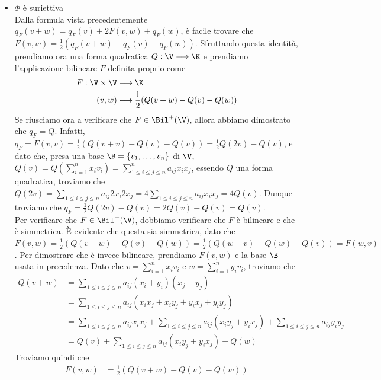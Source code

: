 \documentclass[11pt, a4paper, titlepage, oneside]{scrbook}
\begin{document}
\begin{itemize}
\begin{itemize}
        \item $\Phi$ è suriettiva \\
        Dalla formula vista precedentemente \mbox{$q_F(v+w) = q_F(v) + 2F(v,w) + q_F(w)$}, è facile trovare che $F(v,w) = \frac{1}{2}(q_F(v+w) - q_F(v) - q_F(w))$. Sfruttando questa identità, prendiamo ora una forma quadratica $Q: \V \longrightarrow \K$ e prendiamo l'applicazione bilineare $F$ definita proprio come
        \begin{align*}
        F: \V \times \V &\longrightarrow \K  \\
        (v,w) &\longmapsto \frac{1}{2}(Q(v+w) - Q(v) - Q(w)) 
        \end{align*}
        Se riusciamo ora a verificare che $F \in \Bil^+(\V)$, allora abbiamo dimostrato che $q_F = Q$. Infatti, \mbox{$q_F = F(v,v) = \frac{1}{2} (Q(v+v) - Q(v) - Q(v)) = \frac{1}{2}Q(2v) - Q(v)$}, e dato che, presa una base $\B = \{v_1, \ldots, v_n\}$ di $\V$, $Q(v) = Q(\sum_{i = 1}^n x_i v_i) = \sum_{1 \leq i \leq j \leq n}^n a_{ij} x_i x_j$, essendo $Q$ una forma quadratica, troviamo che \mbox{$Q(2v) = \sum_{1 \leq i \leq j \leq n} a_{ij} 2x_i 2x_j = 4 \sum_{1 \leq i \leq j \leq n} a_{ij} x_i x_j = 4 Q(v)$}. Dunque troviamo che $q_F = \frac{1}{2} Q(2v) - Q(v) = 2Q(v) - Q(v) = Q(v)$. \\
        Per verificare che $F \in \Bil^+(\V)$, dobbiamo verificare che $F$ è bilineare e che è simmetrica. È evidente che questa sia simmetrica, dato che \mbox{$F(v,w) = \frac{1}{2}(Q(v+w) - Q(v) - Q(w)) = \frac{1}{2}(Q(w+v) - Q(w) - Q(v)) = F(w,v)$}. Per dimostrare che è invece bilineare, prendiamo $F(v,w)$ e la base $\B$ usata in precedenza. Dato che $v = \sum_{i = 1}^n x_i v_i$ e $w = \sum_{i = 1}^n y_i v_i$, troviamo che 
        \begin{align*}
        Q(v+w) &= \sum_{1 \leq i \leq j \leq n} a_{ij}(x_i + y_i) (x_j + y_j)  \\
         &= \sum_{1 \leq i \leq j \leq n} a_{ij}(x_ix_j + x_i y_j + y_i x_j + y_i y_j) \\
         &= \sum_{1 \leq i \leq j \leq n} a_{ij} x_i x_j + \sum_{1 \leq i \leq j \leq n} a_{ij} (x_i y_j + y_i x_j) + \sum_{1 \leq i \leq j \leq n} a_{ij} y_i y_j \\
         &= Q(v) + \sum_{1 \leq i \leq j \leq n} a_{ij} (x_i y_j + y_i x_j) + Q(w)
        \end{align*}
        Troviamo quindi che 
        \begin{align*}
        F(v,w) &= \frac{1}{2}(Q(v + w) - Q(v) - Q(w))  \\

\end{align*}
\end{itemize}
\end{itemize}
\end{document}
